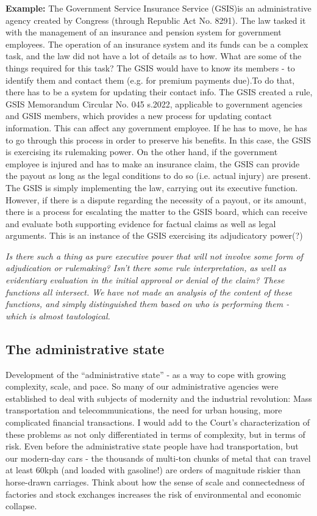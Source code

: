 \documentclass[../main.tex]{subfiles}
\begin{document}
\begin{shaded}

    \textbf{Example:} The Government Service Insurance Service (GSIS)is an administrative agency created by Congress (through Republic Act No. 8291). The law tasked it with the management of an insurance and pension system for government employees. The operation of an insurance system and its funds can be a complex task, and the law did not have a lot of details as to how. What are some of the things required for this task? The GSIS would have to know its members - to identify them and contact them (e.g. for premium payments due).To do that, there has to be a system for updating their contact info. The GSIS created a rule, GSIS Memorandum Circular No. 045 s.2022, applicable to government agencies and GSIS members, which provides a new process for updating contact information. This can affect any government employee. If he has to move, he has to go through this process in order to preserve his benefits. In this case, the GSIS is exercising its rulemaking power. On the other hand, if the government employee is injured and has to make an insurance claim, the GSIS can provide the payout as long as the legal conditions to do so (i.e. actual injury) are present. The GSIS is simply implementing the law, carrying out its executive function. However, if there is a dispute regarding the necessity of a payout, or its amount, there is a process for escalating the matter to the GSIS board, which can receive and evaluate both supporting evidence for factual claims as well as legal arguments. This is an instance of the GSIS exercising its adjudicatory power(?) \newline

    \textit{Is there such a thing as pure executive power that will not involve some form of adjudication or rulemaking? Isn't there some rule interpretation, as well as evidentiary evaluation in the initial approval or denial of the claim? These functions all intersect. We have not made an analysis of the content of these functions, and simply distinguished them based on who is performing them - which is almost tautological.}
\end{shaded}

\subsection{The administrative state}Development of the “administrative state” - as a way to cope with growing complexity, scale, and pace. So many of our administrative agencies were established to deal with subjects of modernity and the industrial revolution: Mass transportation and telecommunications, the need for urban housing, more complicated financial transactions. I would add to the Court's characterization of these problems as not only differentiated in terms of complexity, but in terms of risk. Even before the administrative state people have had transportation, but our modern-day cars - the thousands of multi-ton chunks of metal that can travel at least 60kph (and loaded with gasoline!) are orders of magnitude riskier than horse-drawn carriages. Think about how the sense of scale and connectedness of factories and stock exchanges increases the risk of environmental and economic collapse.
\end{document}
